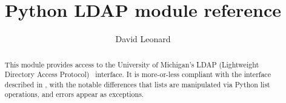 \documentclass{manual}
\title{Python LDAP module reference}
\author{David Leonard}
\begin{document}
\maketitle

\begin{abstract}

 \noindent
This module provides access to the University of Michigan's LDAP 
(Lightweight Directory Access Protocol) \C\ interface. 
It is more-or-less compliant with the interface described in ,
with the notable differences that lists are manipulated via Python
list operations, and errors appear as exceptions.

\end{abstract}

\tableofcontents


\end{document}
